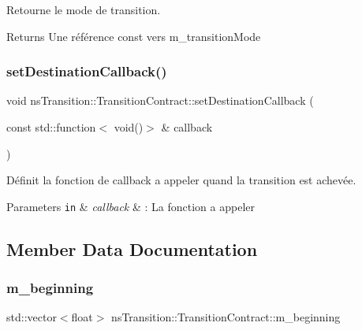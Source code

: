Retourne le mode de transition. 

\begin{DoxyReturn}{Returns}
Une référence const vers m\+\_\+transition\+Mode 
\end{DoxyReturn}
\mbox{\label{classns_transition_1_1_transition_contract_a8f1ebafd9966553678fd7845f35bac33}} 
\subsubsection{\texorpdfstring{set\+Destination\+Callback()}{setDestinationCallback()}}
{\footnotesize\ttfamily void ns\+Transition\+::\+Transition\+Contract\+::set\+Destination\+Callback (\begin{DoxyParamCaption}\item[{const std\+::function$<$ void()$>$ \&}]{callback }\end{DoxyParamCaption})}



Définit la fonction de callback a appeler quand la transition est achevée. 


\begin{DoxyParams}[1]{Parameters}
\mbox{\tt in}  & {\em callback} & \+: La fonction a appeler \\
\hline
\end{DoxyParams}


\subsection{Member Data Documentation}
\mbox{\label{classns_transition_1_1_transition_contract_a5f804f0f4cc00d48e139ff93c5469954}} 
\subsubsection{\texorpdfstring{m\+\_\+beginning}{m\_beginning}}
{\footnotesize\ttfamily std\+::vector$<$float$>$ ns\+Transition\+::\+Transition\+Contract\+::m\+\_\+beginning\hspace{0.3cm}{\ttfamily [protected]}}



